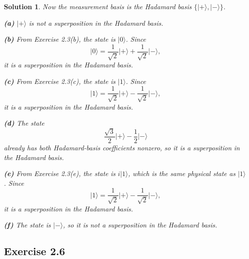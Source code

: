 \documentclass[11pt,a4paper]{article}
\theoremstyle{sol}
\newtheorem*{solution}{Solution}
\newcommand{\ket}[1]{\lvert #1\rangle}
\begin{document}
\begin{solution}
Now the measurement basis is the Hadamard basis $\{\ket{+},\ket{-}\}$.

\textbf{(a)} $\ket{+}$ is \emph{not} a superposition in the Hadamard basis.

\textbf{(b)} From Exercise 2.3(b), the state is $\ket{0}$. Since
\[
\ket{0}=\frac{1}{\sqrt2}\ket{+}+\frac{1}{\sqrt2}\ket{-},
\]
it \emph{is} a superposition in the Hadamard basis.

\textbf{(c)} From Exercise 2.3(c), the state is $\ket{1}$. Since
\[
\ket{1}=\frac{1}{\sqrt2}\ket{+}-\frac{1}{\sqrt2}\ket{-},
\]
it \emph{is} a superposition in the Hadamard basis.

\textbf{(d)} The state
\[
\frac{\sqrt3}{2}\ket{+}-\frac12\ket{-}
\]
already has both Hadamard-basis coefficients nonzero, so it \emph{is} a superposition in the Hadamard basis.

\textbf{(e)} From Exercise 2.3(e), the state is $i\ket{1}$, which is the same physical state as $\ket{1}$. Since
\[
\ket{1}=\frac{1}{\sqrt2}\ket{+}-\frac{1}{\sqrt2}\ket{-},
\]
it \emph{is} a superposition in the Hadamard basis.

\textbf{(f)} The state is $\ket{-}$, so it is \emph{not} a superposition in the Hadamard basis.
\end{solution}

\clearpage
\subsection*{Exercise 2.6}
\end{document}
